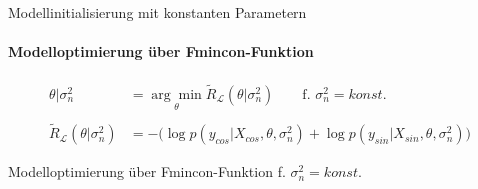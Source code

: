 \begin{algorithm}
	\SetAlgoLined
	\caption{Modellinitialisierung mit konstanten Parametern}
	\label{alg:gprinit}
\end{algorithm}


\paragraph*{Modelloptimierung über Fmincon-Funktion}


\begin{align}\label{eq:fmincon}
    \theta|\sigma_n^2 &= \underset{\theta}{\arg\min} \tilde{R}_{\mathcal{L}}(\theta|\sigma_n^2) \qquad \text{f. } \sigma_n^2 = konst. \nonumber \\
	\\
	\tilde{R}_{\mathcal{L}}(\theta|\sigma_n^2) &= -\big( \log p(y_{cos}|X_{cos}, \theta, \sigma_n^2) + \log p(y_{sin}|X_{sin}, \theta, \sigma_n^2) \big) \nonumber
\end{align}


\begin{algorithm}
	\SetAlgoLined
	\KwIn{}
	\caption{Modelloptimierung über Fmincon-Funktion f. $\sigma_n^2 = konst.$}
	\label{alg:fminconopt}
\end{algorithm}

